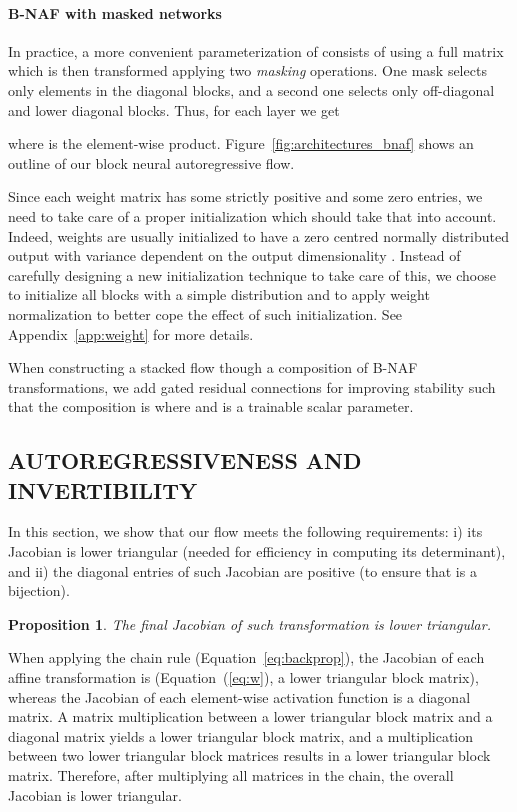 \documentclass[letterpaper]{article}
\newtheorem{proposition}{Proposition}
\begin{document}
\paragraph{B-NAF with masked networks}
In practice, a more convenient parameterization of  consists of using a full matrix  which is then transformed applying two \emph{masking} operations. One mask  selects only elements in the diagonal blocks, and a second one  selects only off-diagonal and lower diagonal blocks. Thus, for each layer  we get

where  is the element-wise product. Figure~\ref{fig:architectures_bnaf} shows an outline of our block neural autoregressive flow.

Since each weight matrix  has some strictly positive and some zero entries, we need to take care of a proper initialization which should take that into account. Indeed, weights are usually initialized to have a zero centred normally distributed output with variance dependent on the output dimensionality \citep{glorot2010understanding}. Instead of carefully designing a new initialization technique to take care of this, we choose to initialize all blocks with a simple distribution and to apply weight normalization \citep{salimans2016weight} to better cope the effect of such initialization. See Appendix~\ref{app:weight} for more details.

When constructing a stacked flow though a composition of  B-NAF transformations, we add gated residual connections for improving stability such that the composition is  where  and  is a trainable scalar parameter.

\subsection{AUTOREGRESSIVENESS AND INVERTIBILITY}
In this section, we show that our flow  meets the following requirements: i) its Jacobian  is lower triangular (needed for efficiency in computing its determinant), and ii) the diagonal entries of such Jacobian are positive (to ensure that  is a bijection).

\begin{proposition} \label{pro:lower}
The final Jacobian  of such transformation is lower triangular.
\end{proposition}
\begin{proofsketch}
When applying the chain rule (Equation~\ref{eq:backprop}), the Jacobian of each affine transformation is  (Equation~(\ref{eq:w}), a lower triangular block matrix), whereas the Jacobian of each element-wise activation function is a diagonal matrix. A matrix multiplication between a lower triangular block matrix and a diagonal matrix yields a lower triangular block matrix, and a multiplication between two lower triangular block matrices results in a lower triangular block matrix. Therefore, after multiplying all matrices in the chain, the overall Jacobian is lower triangular.
\end{proofsketch}
\end{document}
